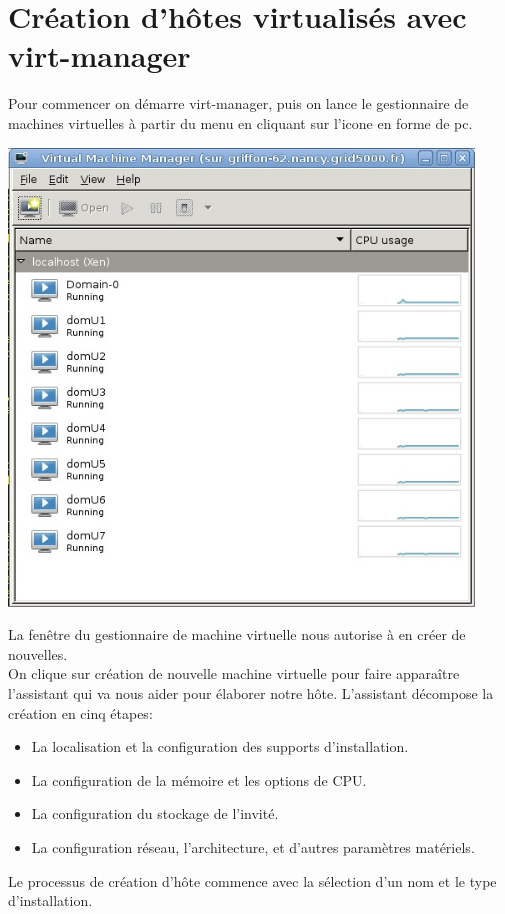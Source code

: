 \section{Création d'hôtes virtualisés avec virt-manager}
Pour commencer on démarre virt-manager, puis on lance le gestionnaire de machines virtuelles à partir du menu en cliquant sur l'icone en forme de pc.

\begin{center}
\includegraphics[width=350pt]{images/virt.jpg}
\end{center}

La fenêtre du gestionnaire de machine virtuelle nous autorise à en créer de nouvelles.\\
On clique sur création de nouvelle machine virtuelle pour faire apparaître l'assistant qui va nous aider pour élaborer notre hôte.
L'assistant décompose la création en cinq étapes:
\begin{itemize}
\item La localisation et la configuration des supports d'installation.
\item La configuration de la mémoire et les options de CPU.
\item La configuration du stockage de l'invité.
\item La configuration réseau, l'architecture, et d'autres paramètres matériels.
\end{itemize}
Le processus de création d'hôte commence avec la sélection d'un nom et le type d'installation.

